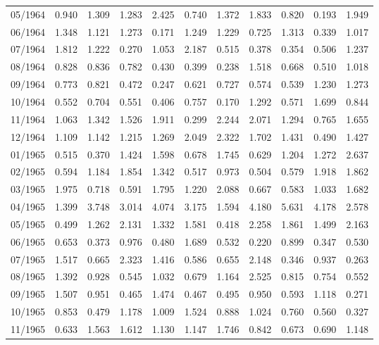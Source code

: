 \begin{tabular}{lrrrrrrrrrr}
05/1964 &  0.940 &  1.309 &  1.283 &  2.425 &  0.740 &  1.372 &  1.833 &  0.820 &  0.193 &  1.949 \\
06/1964 &  1.348 &  1.121 &  1.273 &  0.171 &  1.249 &  1.229 &  0.725 &  1.313 &  0.339 &  1.017 \\
07/1964 &  1.812 &  1.222 &  0.270 &  1.053 &  2.187 &  0.515 &  0.378 &  0.354 &  0.506 &  1.237 \\
08/1964 &  0.828 &  0.836 &  0.782 &  0.430 &  0.399 &  0.238 &  1.518 &  0.668 &  0.510 &  1.018 \\
09/1964 &  0.773 &  0.821 &  0.472 &  0.247 &  0.621 &  0.727 &  0.574 &  0.539 &  1.230 &  1.273 \\
10/1964 &  0.552 &  0.704 &  0.551 &  0.406 &  0.757 &  0.170 &  1.292 &  0.571 &  1.699 &  0.844 \\
11/1964 &  1.063 &  1.342 &  1.526 &  1.911 &  0.299 &  2.244 &  2.071 &  1.294 &  0.765 &  1.655 \\
12/1964 &  1.109 &  1.142 &  1.215 &  1.269 &  2.049 &  2.322 &  1.702 &  1.431 &  0.490 &  1.427 \\
01/1965 &  0.515 &  0.370 &  1.424 &  1.598 &  0.678 &  1.745 &  0.629 &  1.204 &  1.272 &  2.637 \\
02/1965 &  0.594 &  1.184 &  1.854 &  1.342 &  0.517 &  0.973 &  0.504 &  0.579 &  1.918 &  1.862 \\
03/1965 &  1.975 &  0.718 &  0.591 &  1.795 &  1.220 &  2.088 &  0.667 &  0.583 &  1.033 &  1.682 \\
04/1965 &  1.399 &  3.748 &  3.014 &  4.074 &  3.175 &  1.594 &  4.180 &  5.631 &  4.178 &  2.578 \\
05/1965 &  0.499 &  1.262 &  2.131 &  1.332 &  1.581 &  0.418 &  2.258 &  1.861 &  1.499 &  2.163 \\
06/1965 &  0.653 &  0.373 &  0.976 &  0.480 &  1.689 &  0.532 &  0.220 &  0.899 &  0.347 &  0.530 \\
07/1965 &  1.517 &  0.665 &  2.323 &  1.416 &  0.586 &  0.655 &  2.148 &  0.346 &  0.937 &  0.263 \\
08/1965 &  1.392 &  0.928 &  0.545 &  1.032 &  0.679 &  1.164 &  2.525 &  0.815 &  0.754 &  0.552 \\
09/1965 &  1.507 &  0.951 &  0.465 &  1.474 &  0.467 &  0.495 &  0.950 &  0.593 &  1.118 &  0.271 \\
10/1965 &  0.853 &  0.479 &  1.178 &  1.009 &  1.524 &  0.888 &  1.024 &  0.760 &  0.560 &  0.327 \\
11/1965 &  0.633 &  1.563 &  1.612 &  1.130 &  1.147 &  1.746 &  0.842 &  0.673 &  0.690 &  1.148 \\

\end{tabular}
